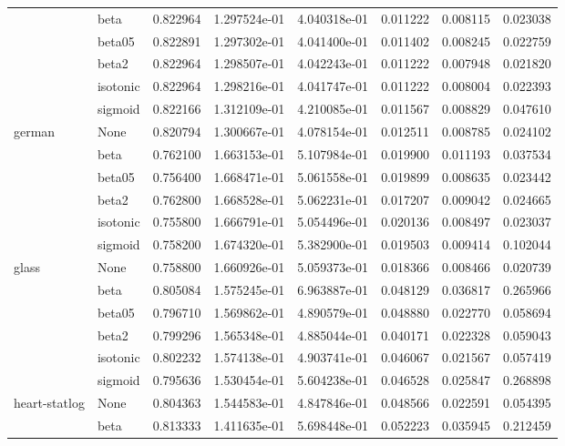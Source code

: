 \begin{tabular}{llrrrrrr}
        & beta &  0.822964 &  1.297524e-01 &  4.040318e-01 &  0.011222 &  0.008115 &  0.023038 \\
        & beta05 &  0.822891 &  1.297302e-01 &  4.041400e-01 &  0.011402 &  0.008245 &  0.022759 \\
        & beta2 &  0.822964 &  1.298507e-01 &  4.042243e-01 &  0.011222 &  0.007948 &  0.021820 \\
        & isotonic &  0.822964 &  1.298216e-01 &  4.041747e-01 &  0.011222 &  0.008004 &  0.022393 \\
        & sigmoid &  0.822166 &  1.312109e-01 &  4.210085e-01 &  0.011567 &  0.008829 &  0.047610 \\
german & None &  0.820794 &  1.300667e-01 &  4.078154e-01 &  0.012511 &  0.008785 &  0.024102 \\
        & beta &  0.762100 &  1.663153e-01 &  5.107984e-01 &  0.019900 &  0.011193 &  0.037534 \\
        & beta05 &  0.756400 &  1.668471e-01 &  5.061558e-01 &  0.019899 &  0.008635 &  0.023442 \\
        & beta2 &  0.762800 &  1.668528e-01 &  5.062231e-01 &  0.017207 &  0.009042 &  0.024665 \\
        & isotonic &  0.755800 &  1.666791e-01 &  5.054496e-01 &  0.020136 &  0.008497 &  0.023037 \\
        & sigmoid &  0.758200 &  1.674320e-01 &  5.382900e-01 &  0.019503 &  0.009414 &  0.102044 \\
glass & None &  0.758800 &  1.660926e-01 &  5.059373e-01 &  0.018366 &  0.008466 &  0.020739 \\
        & beta &  0.805084 &  1.575245e-01 &  6.963887e-01 &  0.048129 &  0.036817 &  0.265966 \\
        & beta05 &  0.796710 &  1.569862e-01 &  4.890579e-01 &  0.048880 &  0.022770 &  0.058694 \\
        & beta2 &  0.799296 &  1.565348e-01 &  4.885044e-01 &  0.040171 &  0.022328 &  0.059043 \\
        & isotonic &  0.802232 &  1.574138e-01 &  4.903741e-01 &  0.046067 &  0.021567 &  0.057419 \\
        & sigmoid &  0.795636 &  1.530454e-01 &  5.604238e-01 &  0.046528 &  0.025847 &  0.268898 \\
heart-statlog & None &  0.804363 &  1.544583e-01 &  4.847846e-01 &  0.048566 &  0.022591 &  0.054395 \\
        & beta &  0.813333 &  1.411635e-01 &  5.698448e-01 &  0.052223 &  0.035945 &  0.212459 \\

\end{tabular}
